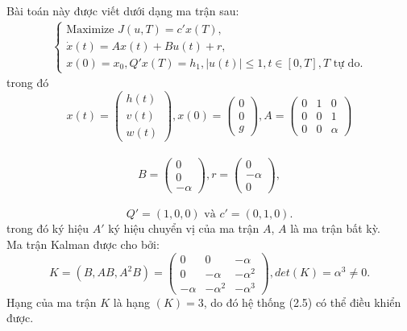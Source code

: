 \documentclass[12pt,a4paper]{report}
\begin{document}
Bài toán này được viết dưới dạng ma trận sau: 
\begin{eqnarray}
	\begin{cases}
		\text{Maximize } J(u, T) = c'x(T), \\ \dot{x}(t) = Ax(t) + Bu(t) + r, \\ x(0) = x_0, Q'x(T) = h_1, |u(t)|\leq 1, t \in [0, T], T \text{ tự do.}
	\end{cases}
\end{eqnarray} trong đó 
$$x(t) = \begin{pmatrix}
	h(t) \\ v(t) \\ w(t)
\end{pmatrix}, x(0) = \begin{pmatrix}
0 \\ 0 \\ g
\end{pmatrix}, A = \begin{pmatrix}
0&1&0 \\ 0&0&1 \\ 0&0& \alpha
\end{pmatrix}$$\\
$$B = \begin{pmatrix}
	0\\0\\-\alpha
\end{pmatrix}, r = \begin{pmatrix}
0\\-\alpha\\0
\end{pmatrix},$$\\
$$Q'=(1,0,0) \text{ và } c'=(0,1,0).$$ trong đó ký hiệu $A'$ ký hiệu chuyển vị của ma trận $A$, $A$ là ma trận bất kỳ. \\Ma trận Kalman được cho bởi:  $$K = (B, AB, A^2B) = \begin{pmatrix}
	0&0&-\alpha\\0&-\alpha&-\alpha^2\\-\alpha&-\alpha^2&-\alpha^3
\end{pmatrix}, det(K) = \alpha^3 \neq 0.$$ Hạng của ma trận $K$ là hạng $(K) = 3$, do đó hệ thống (2.5) có thể điều khiển được.
\end{document}
